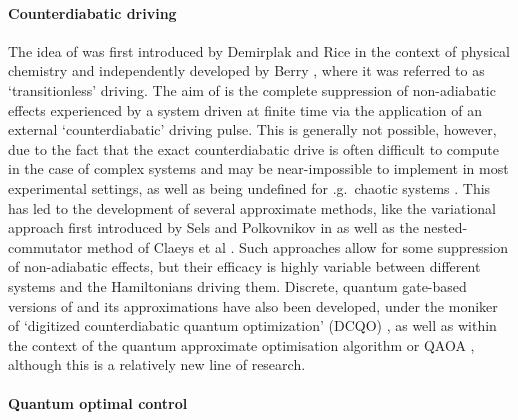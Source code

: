 \paragraph*{Counterdiabatic driving}

The idea of  was first introduced by Demirplak and Rice in the context of physical chemistry \cite{demirplak_adiabatic_2003} and independently developed by Berry \cite{berry_transitionless_2009}, where it was referred to as `transitionless' driving. The aim of  is the complete suppression of non-adiabatic effects experienced by a system driven at finite time via the application of an external `counterdiabatic' driving pulse. This is generally not possible, however, due to the fact that the exact counterdiabatic drive is often difficult to compute in the case of complex systems and may be near-impossible to implement in most experimental settings, as well as being undefined for \@e.g.~chaotic systems \cite{kolodrubetz_geometry_2017, pandey_adiabatic_2020, sugiura_adiabatic_2021}. This has led to the development of several approximate  methods, like the variational approach first introduced by Sels and Polkovnikov in \cite{sels_minimizing_2017} as well as the nested-commutator method of Claeys et al \cite{claeys_floquet-engineering_2019}. Such approaches allow for some suppression of non-adiabatic effects, but their efficacy is highly variable between different systems and the Hamiltonians driving them. Discrete, quantum gate-based versions of  and its approximations have also been developed, under the moniker of `digitized counterdiabatic quantum optimization' (DCQO) \cite{hegade_digitized_2022}, as well as within the context of the quantum approximate optimisation algorithm or QAOA \cite{wurtz_counterdiabaticity_2022}, although this is a relatively new line of research.

\paragraph*{Quantum optimal control}

